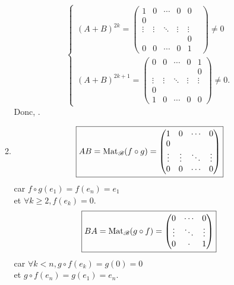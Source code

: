 \begin{enumerate}
\begin{enumerate}
\[{\begin{cases}
							(A+B)^{2k} = \begin{pmatrix}
								1&0&\cdots&0&0\\
								0&&&&&\\
								\vdots&\vdots&\ddots&\vdots&\vdots\\
								&&&&0\\
								0&0&\cdots&0&1
							\end{pmatrix} \neq 0\\
							(A+B)^{2k+1} = \begin{pmatrix}
								0&0&\cdots&0&1\\
								&&&&0\\
								\vdots&\vdots&\ddots&\vdots&\vdots\\
								0&&&&\\
								1&0&\cdots&0&0
							\end{pmatrix} \neq 0.
						\end{cases}}
					\] Donc, .
				\item
					\[\boxed{AB = \operatorname{Mat}_\mathcal{B}(f \circ g)
					= \begin{pmatrix}
						1&0&\cdots&0\\
						0\\
						\vdots&\vdots&\ddots&\vdots\\
						0&0&\cdots&0
					\end{pmatrix}}
					\]
					car $f \circ g(e_1) = f(e_n) = e_1$ \\
					et $\forall k \ge 2, f(e_k) = 0$.
					\[
						\boxed{ BA = \operatorname{Mat}_\mathcal{B}(g \circ f) = \begin{pmatrix}
								0&\cdots&0\\
								\vdots&\ddots&\vdots\\
								0&\cdot&1
						\end{pmatrix}}
					\] car $\forall k < n, g \circ f(e_k) = g(0) = 0$\\
					et $g \circ f(e_n) = g(e_1) = e_n$.
					

\end{enumerate}
\end{enumerate}

